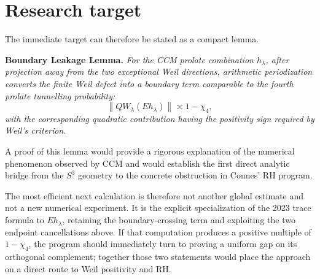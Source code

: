 \documentclass[11pt]{article}
\begin{document}
\section{Research target}

The immediate target can therefore be stated as a compact lemma.

\medskip
\noindent
\textbf{Boundary Leakage Lemma.}
\emph{For the CCM prolate combination \(h_\lambda\), after projection
away from the two exceptional Weil directions, arithmetic
periodization converts the finite Weil defect into a boundary term
comparable to the fourth prolate tunnelling probability:}
\[
        \left\|QW_\lambda(Eh_\lambda)\right\|
        \asymp
        1-\chi_4,
\]
\emph{with the corresponding quadratic contribution having the
positivity sign required by Weil's criterion.}

\medskip

A proof of this lemma would provide a rigorous explanation of the
numerical phenomenon observed by CCM and would establish the first
direct analytic bridge from the \(S^3\) geometry to the concrete
obstruction in Connes' RH program.

The most efficient next calculation is therefore not another global
estimate and not a new numerical experiment.  It is the explicit
specialization of the 2023 trace formula to \(Eh_\lambda\), retaining
the boundary-crossing term and exploiting the two endpoint
cancellations above.  If that computation produces a positive multiple
of \(1-\chi_4\), the program should immediately turn to proving a
uniform gap on its orthogonal complement; together those two statements
would place the approach on a direct route to Weil positivity and RH.
\end{document}
